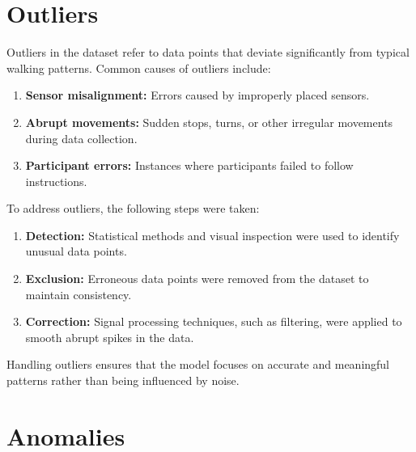 \section{Outliers}

Outliers in the dataset refer to data points that deviate significantly from typical walking patterns. Common causes of outliers include:
\begin{enumerate}
\item\textbf{ Sensor misalignment:} Errors caused by improperly placed sensors.

\item \textbf{Abrupt movements:} Sudden stops, turns, or other irregular movements during data collection.

\item \textbf{Participant errors:} Instances where participants failed to follow instructions.
\end{enumerate}
To address outliers, the following steps were taken:
\begin{enumerate}
\item \textbf{Detection:} Statistical methods and visual inspection were used to identify unusual data points.

\item \textbf{Exclusion:} Erroneous data points were removed from the dataset to maintain consistency.

\item \textbf{Correction:} Signal processing techniques, such as filtering, were applied to smooth abrupt spikes in the data\cite{ZhangWenwen:2022}.
\end{enumerate}
Handling outliers ensures that the model focuses on accurate and meaningful patterns rather than being influenced by noise.



\section{Anomalies}


